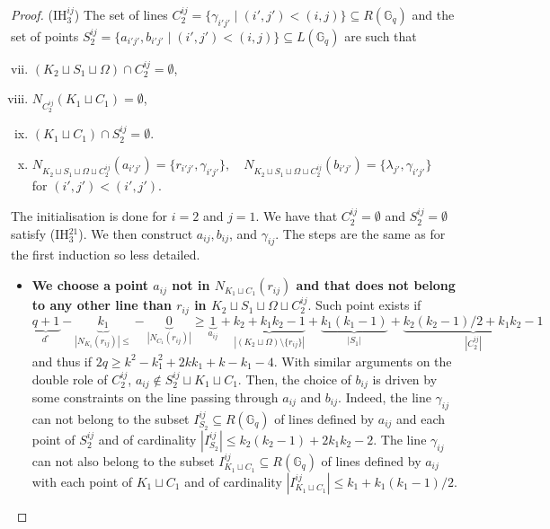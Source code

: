 \documentclass[10pt,a4paper]{article}
\newcommand{\ls}{\leqslant}
\newcommand{\gs}{\geqslant}
\newcommand{\G}[1][q]{\mathbb{G}_{#1}}
\begin{document}
\begin{proof}
        (IH$_3^{ij}$) The set of lines $C_2^{ij} = \{\gamma_{i'j'}\mid (i',j')<(i,j)\} \subseteq R(\G)$ and the set of points $S_2^{ij} = \{a_{i'j'}, b_{i'j'}\mid (i',j')<(i,j)\} \subseteq L(\G)$ are such that
        \begin{enumerate}[(i)]
            \setcounter{enumi}{6}
            \item $ \left(K_2 \sqcup S_1 \sqcup \Omega\right) \cap C_2^{ij} = \emptyset$,
            \item $ N_{C_2^{ij}} (K_1 \sqcup C_1) = \emptyset$,
            \item $(K_1 \sqcup C_1) \cap S_2^{ij}  = \emptyset$.
            \item $N_{K_2 \sqcup S_1 \sqcup \Omega \sqcup C_2^{ij}}(a_{i'j'}) = \{r_{i'j'},\gamma_{i'j'}\}, \quad N_{K_2 \sqcup S_1 \sqcup \Omega \sqcup C_2^{ij}}(b_{i'j'}) = \{\lambda_{j'}, \gamma_{i'j'}\}$ \\ for $(i',j') < (i', j')$.
        \end{enumerate}
        The initialisation is done for $i=2$ and $j=1$. We have that 
        $C_2^{ij} = \emptyset$ and $S_2^{ij} = \emptyset$ satisfy (IH$_3^{21}$).
        We then construct $a_{ij}, b_{ij}$, and $\gamma_{ij}$. The steps are the same as for the first induction so less detailed.
        \begin{itemize}
            \item \textbf{We choose a point $a_{ij}$ not in $N_{K_1 \sqcup C_1}(r_{ij})$ and that does not belong to any other line than $r_{ij}$ in $K_2 \sqcup S_1 \sqcup \Omega \sqcup C_2^{ij}$}. Such point exists if \[\underbrace{q+1}_{d^\circ} - \underbrace{k_1}_{|N_{K_1}(r_{ij})|\ls} - \underbrace{0}_{|N_{C_1}(r_{ij})|} \gs \underbrace{1}_{a_{ij}} + \underbrace{k_2 + k_1k_2 - 1}_{|(K_2 \sqcup \Omega)\setminus \{r_{ij}\}|} + \underbrace{k_1(k_1-1)}_{|S_1|} + \underbrace{k_2(k_2-1)/2+k_1k_2 - 1}_{|C_2^{ij}|}\] and thus if $2q \gs k^2 - k_1^2 + 2kk_1 + k - k_1 - 4$. With similar arguments on the double role of $C_2^{ij}$, $a_{ij} \notin S_2^{ij} \sqcup K_1 \sqcup C_1$. Then, the choice of $b_{ij}$ is driven by some constraints on the line passing through $a_{ij}$ and $b_{ij}$. Indeed, the line $\gamma_{ij}$ can not belong  to the subset $I_{S_2}^{ij} \subseteq R(\G)$ of lines defined by $a_{ij}$ and each point of $S_2^{ij}$ and of cardinality $|I_{S_2}^{ij}| \ls k_2(k_2-1) + 2k_1k_2 - 2$. The line $\gamma_{ij}$ can not also belong to the subset $I_{K_1\sqcup C_1}^{ij} \subseteq R(\G)$ of lines defined by $a_{ij}$ with each point of $K_1 \sqcup C_1$ and of cardinality $|I_{K_1\sqcup C_1}^{ij}| \ls k_1 + k_1(k_1-1)/2$.

\end{itemize}
\end{proof}
\end{document}

